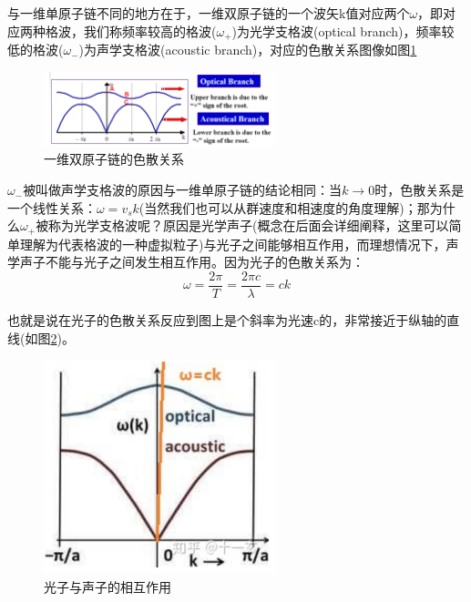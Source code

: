 \documentclass{ctexart}
\begin{document}
                与一维单原子链不同的地方在于，一维双原子链的一个波矢k值对应两个$\omega$，即对应两种格波，我们称频率较高的格波($\omega_+$)为光学支格波(optical branch)，频率较低的格波($\omega_-$)为声学支格波(acoustic branch)，对应的色散关系图像如图\ref{fig:dispertionrelation_1Ddiaatomic}
                \begin{figure}[H]
                    \centering
                    \includegraphics[width=0.6\textwidth]{figure/一维双原子链的色散关系.png}
                    \caption{一维双原子链的色散关系}
                    \label{fig:dispertionrelation_1Ddiaatomic}
                \end{figure}
                
                $\omega_-$被叫做声学支格波的原因与一维单原子链的结论相同：当$k\rightarrow 0$时，色散关系是一个线性关系：$\omega=v_sk$(当然我们也可以从群速度和相速度的角度理解)；那为什么$\omega_+$被称为光学支格波呢？原因是光学声子(概念在后面会详细阐释，这里可以简单理解为代表格波的一种虚拟粒子)与光子之间能够相互作用，而理想情况下，声学声子不能与光子之间发生相互作用。因为光子的色散关系为：
                \begin{equation}
                    \omega=\frac{2\pi}{T}=\frac{2\pi c}{\lambda}=ck
                \end{equation}
                
                也就是说在光子的色散关系反应到图上是个斜率为光速c的，非常接近于纵轴的直线(如图\ref{fig:interact})。
                \begin{figure}[H]
                    \centering
                    \includegraphics[width=0.6\textwidth]{figure/光子与声子的相互作用.png}
                    \caption{光子与声子的相互作用}
                    \label{fig:interact}
                \end{figure}
                
\end{document}
